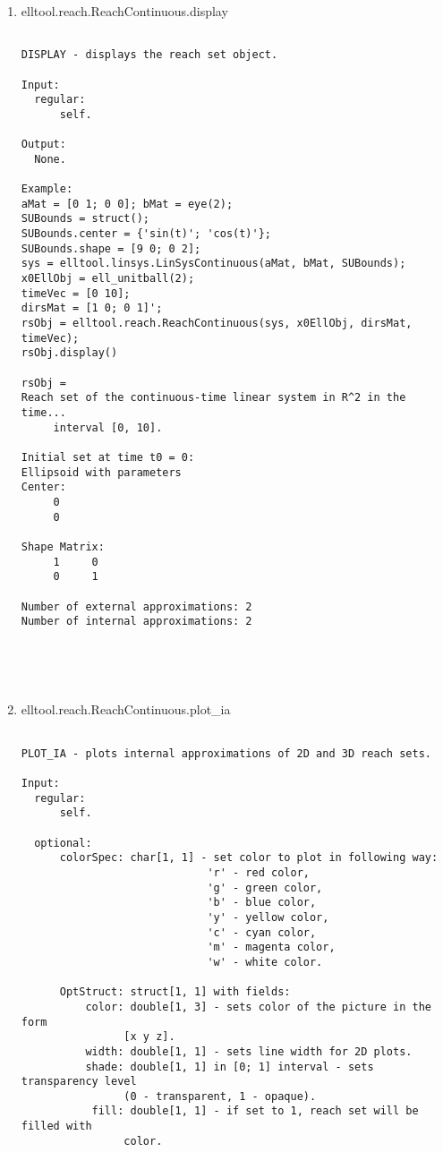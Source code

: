 \begin{enumerate}
\begin{lstlisting}
\end{lstlisting}
\fontfamily{\familydefault}
\selectfont
\item {elltool.reach.ReachContinuous.display}
\selectfont
\begin{lstlisting}

DISPLAY - displays the reach set object.

Input:
  regular:
      self.

Output:
  None.

Example:
aMat = [0 1; 0 0]; bMat = eye(2);
SUBounds = struct();
SUBounds.center = {'sin(t)'; 'cos(t)'};
SUBounds.shape = [9 0; 0 2];
sys = elltool.linsys.LinSysContinuous(aMat, bMat, SUBounds);
x0EllObj = ell_unitball(2);
timeVec = [0 10];
dirsMat = [1 0; 0 1]';
rsObj = elltool.reach.ReachContinuous(sys, x0EllObj, dirsMat, timeVec);
rsObj.display()

rsObj =
Reach set of the continuous-time linear system in R^2 in the time...
     interval [0, 10].

Initial set at time t0 = 0:
Ellipsoid with parameters
Center:
     0
     0

Shape Matrix:
     1     0
     0     1

Number of external approximations: 2
Number of internal approximations: 2





\end{lstlisting}
\fontfamily{\familydefault}
\selectfont
\item {elltool.reach.ReachContinuous.plot\_ia}
\selectfont
\begin{lstlisting}

PLOT_IA - plots internal approximations of 2D and 3D reach sets.

Input:
  regular:
      self.

  optional:
      colorSpec: char[1, 1] - set color to plot in following way:
                             'r' - red color,
                             'g' - green color,
                             'b' - blue color,
                             'y' - yellow color,
                             'c' - cyan color,
                             'm' - magenta color,
                             'w' - white color.

      OptStruct: struct[1, 1] with fields:
          color: double[1, 3] - sets color of the picture in the form
                [x y z].
          width: double[1, 1] - sets line width for 2D plots.
          shade: double[1, 1] in [0; 1] interval - sets transparency level
                (0 - transparent, 1 - opaque).
           fill: double[1, 1] - if set to 1, reach set will be filled with
                color.


\end{lstlisting}
\end{enumerate}
